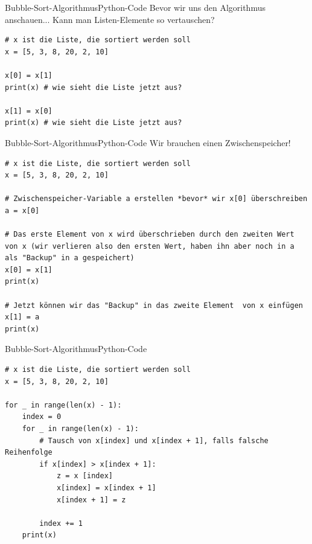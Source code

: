 \begin{frame}[fragile]{Bubble-Sort-Algorithmus}{Python-Code}
Bevor wir uns den Algorithmus anschauen... Kann man Listen-Elemente so vertauschen?
	\begin{lstlisting}
# x ist die Liste, die sortiert werden soll
x = [5, 3, 8, 20, 2, 10]

x[0] = x[1]
print(x) # wie sieht die Liste jetzt aus?

x[1] = x[0]
print(x) # wie sieht die Liste jetzt aus?
	\end{lstlisting}
\end{frame}

\begin{frame}[fragile]{Bubble-Sort-Algorithmus}{Python-Code}
Wir brauchen einen Zwischenspeicher!
	\begin{lstlisting}
# x ist die Liste, die sortiert werden soll
x = [5, 3, 8, 20, 2, 10]

# Zwischenspeicher-Variable a erstellen *bevor* wir x[0] überschreiben
a = x[0] 

# Das erste Element von x wird überschrieben durch den zweiten Wert von x (wir verlieren also den ersten Wert, haben ihn aber noch in a als "Backup" in a gespeichert)
x[0] = x[1]
print(x)

# Jetzt können wir das "Backup" in das zweite Element  von x einfügen
x[1] = a
print(x)
	\end{lstlisting}
\end{frame}

\begin{frame}[fragile]{Bubble-Sort-Algorithmus}{Python-Code}
	\begin{lstlisting}
# x ist die Liste, die sortiert werden soll
x = [5, 3, 8, 20, 2, 10]

for _ in range(len(x) - 1):
    index = 0
	for _ in range(len(x) - 1):
    	# Tausch von x[index] und x[index + 1], falls falsche Reihenfolge
        if x[index] > x[index + 1]:
            z = x [index]
            x[index] = x[index + 1]
            x[index + 1] = z
         
        index += 1
    print(x)
	\end{lstlisting}
\end{frame}

